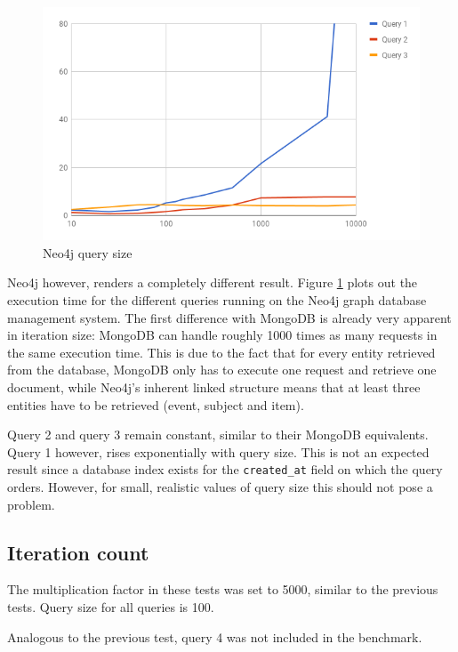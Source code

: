 \begin{figure}[H]
  \centering
  \includegraphics[width=.8\textwidth]{img/neo4j-query-size.png}
  \caption{Neo4j query size}
  \label{fig:neo4j-query-size}
\end{figure}

Neo4j however, renders a completely different result.
Figure \ref{fig:neo4j-query-size} plots out the execution time for the different queries running on the Neo4j graph database management system.
The first difference with MongoDB is already very apparent in iteration size: MongoDB can handle roughly 1000 times as many requests in the same execution time.
This is due to the fact that for every entity retrieved from the database, MongoDB only has to execute one request and retrieve one document, while Neo4j's inherent linked structure means that at least three entities have to be retrieved (event, subject and item).

Query 2 and query 3 remain constant, similar to their MongoDB equivalents.
Query 1 however, rises exponentially with query size.
This is not an expected result since a database index exists for the \texttt{created\_at} field on which the query orders.
However, for small, realistic values of query size this should not pose a problem.

\subsection{Iteration count}
\label{subsec:iteration-size}

The multiplication factor in these tests was set to 5000, similar to the previous tests.
Query size for all queries is 100.

Analogous to the previous test, query 4 was not included in the benchmark.

